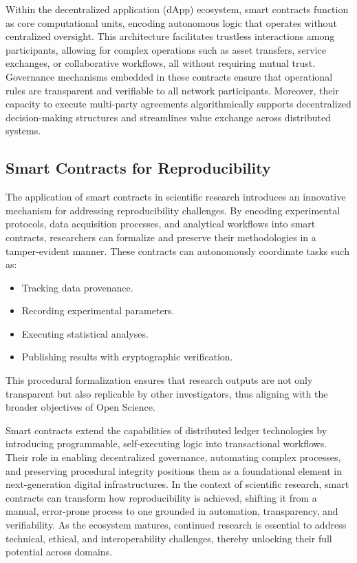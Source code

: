 \documentclass[final]{rc-book-2.14}
\begin{document}
Within the decentralized application (dApp) ecosystem, smart contracts function as core computational units, encoding autonomous logic that operates without centralized oversight. This architecture facilitates trustless interactions among participants, allowing for complex operations such as asset transfers, service exchanges, or collaborative workflows, all without requiring mutual trust. Governance mechanisms embedded in these contracts ensure that operational rules are transparent and verifiable to all network participants. Moreover, their capacity to execute multi-party agreements algorithmically supports decentralized decision-making structures and streamlines value exchange across distributed systems\cite{alharby2017blockchain}.

\subsection{Smart Contracts for Reproducibility}

The application of smart contracts in scientific research introduces an innovative mechanism for addressing reproducibility challenges. By encoding experimental protocols, data acquisition processes, and analytical workflows into smart contracts, researchers can formalize and preserve their methodologies in a tamper-evident manner\cite{pilehchiha2022improving}. These contracts can autonomously coordinate tasks such as:

\begin{itemize}
    \item Tracking data provenance.
    \item Recording experimental parameters.
    \item Executing statistical analyses.
    \item Publishing results with cryptographic verification.
\end{itemize}

This procedural formalization ensures that research outputs are not only transparent but also replicable by other investigators, thus aligning with the broader objectives of Open Science.

Smart contracts extend the capabilities of distributed ledger technologies by introducing programmable, self-executing logic into transactional workflows. Their role in enabling decentralized governance, automating complex processes, and preserving procedural integrity positions them as a foundational element in next-generation digital infrastructures. In the context of scientific research, smart contracts can transform how reproducibility is achieved, shifting it from a manual, error-prone process to one grounded in automation, transparency, and verifiability. As the ecosystem matures, continued research is essential to address technical, ethical, and interoperability challenges, thereby unlocking their full potential across domains.
\end{document}

